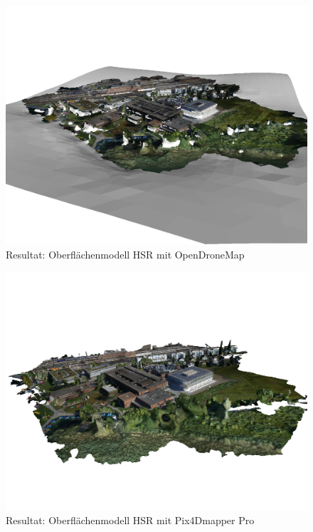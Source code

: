 \begin{figure}[p]
	\centerline{
		\includegraphics[width=16cm]{images/hsr-dsm-odm.png}
	}
	\caption{Resultat: Oberflächenmodell HSR mit OpenDroneMap}
	\label{img:hsr-dsm-odm}
\end{figure}

\begin{figure}[p]
	\centerline{
		\includegraphics[width=15cm]{images/hsr-dsm-pix4d.png}
	}
	\caption{Resultat: Oberflächenmodell HSR mit Pix4Dmapper Pro}
	\label{img:hsr-dsm-pix4d}
\end{figure}


